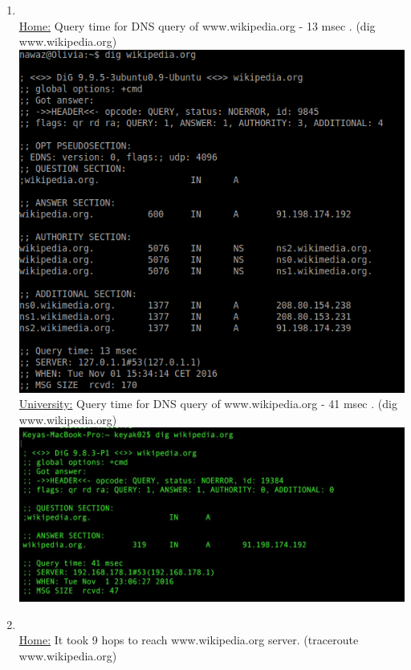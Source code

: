 \documentclass{WeSTassignment}
\begin{document}
\begin{enumerate}
\\
\item \\
\underline{Home:} Query time for DNS query of www.wikipedia.org - 13 msec . (dig www.wikipedia.org) \\
\includegraphics[width=1\textwidth]{images/home-query-time(4-0).png}
\\
\underline{University:} Query time for DNS query of www.wikipedia.org - 41 msec . (dig www.wikipedia.org) \\
\includegraphics[width=1\textwidth]{images/out-query-time(4-0).png}
\\
\item \\
\underline{Home:} It took 9 hops to reach www.wikipedia.org server. (traceroute www.wikipedia.org) \\

\end{enumerate}
\end{document}
